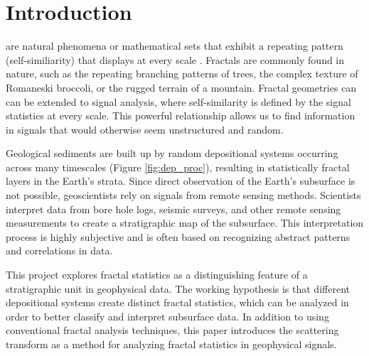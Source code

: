 \documentclass[journal]{IEEEtran}
\begin{document}
\section{Introduction}
% 
% 
% 
% 
 are natural phenomena or mathematical sets
that exhibit a repeating pattern (self-similiarity) that displays at every scale
\cite{fractal_wiki}\cite{Mandelbrot}. Fractals are commonly found in nature, such as the
repeating branching patterns of trees, the complex texture of Romaneski broccoli, 
or the rugged terrain of a mountain. Fractal geometries can
can be extended to signal analysis, where self-similarity is defined by
the signal statistics at every scale. This powerful relationship
allows us to find information in signals that would otherwise seem 
unstructured and random.



Geological sediments are built up by random depositional systems
occurring across many timescales (Figure \ref{fig:dep_proc}), resulting in statistically fractal layers
in the Earth's strata. Since direct observation of the Earth's subsurface is not possible,
geoscientists rely on signals from remote sensing methods. Scientists interpret 
data from bore hole logs, seismic surveys, and other remote sensing measurements to
create a stratigraphic map of the subsurface. This interpretation process is highly
subjective and is often based on recognizing abstract 
patterns and correlations in data. 


This project explores fractal statistics as a distinguishing feature of a 
stratigraphic unit in geophysical data. The working hypothesis is that different
depositional systems create distinct fractal statistics, which can be analyzed in order
to better classify and interpret subsurface data. In addition to using conventional fractal analysis
techniques, this paper introduces the scattering transform \cite{mallat} as a method for analyzing
fractal statistics in geophysical signals.
\end{document}
